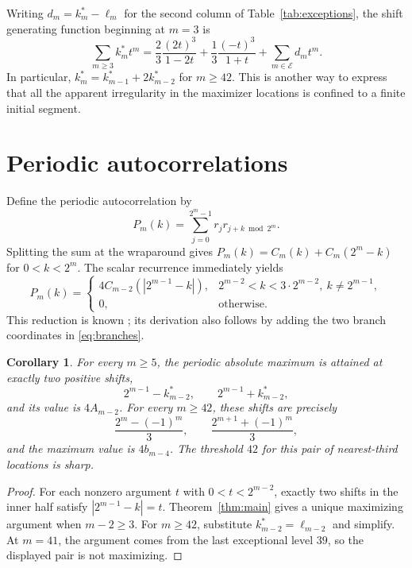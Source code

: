 \documentclass[11pt,a4paper]{article}
\newtheorem{corollary}[theorem]{Corollary}
\theoremstyle{definition}\newtheorem{definition}[theorem]{Definition}
\theoremstyle{remark}\newtheorem{remark}[theorem]{Remark}
\begin{document}
Writing $d_m=k_m^*-\ell_m$ for the second column of
Table~\ref{tab:exceptions}, the shift generating function beginning at $m=3$
is
\begin{equation}
 \sum_{m\ge3}k_m^*t^m
 =\frac23\frac{(2t)^3}{1-2t}
  +\frac13\frac{(-t)^3}{1+t}
  +\sum_{m\in\mathcal E}d_mt^m.
 \label{eq:shiftgf}
\end{equation}
In particular, $k_m^*=k_{m-1}^*+2k_{m-2}^*$ for $m\ge42$.
This is another way to express that all the apparent irregularity in the
maximizer locations is confined to a finite initial segment.

\section{Periodic autocorrelations}
\label{sec:periodic}

Define the periodic autocorrelation by
\[
 P_m(k)=\sum_{j=0}^{2^m-1}r_jr_{j+k\bmod2^m}.
\]
Splitting the sum at the wraparound gives
$P_m(k)=C_m(k)+C_m(2^m-k)$ for $0<k<2^m$.
The scalar recurrence immediately yields
\begin{equation}
 P_m(k)=
 \begin{cases}
 4C_{m-2}(|2^{m-1}-k|),&2^{m-2}<k<3\cdot2^{m-2},\ k\ne2^{m-1},\\
 0,&\text{otherwise}.
 \end{cases}
 \label{eq:periodic}
\end{equation}
This reduction is known \citep[Theorem~12]{Tarnu2023}; its derivation also
follows by adding the two branch coordinates in \eqref{eq:branches}.

\begin{corollary}
\label{cor:periodic}
For every $m\ge5$, the periodic absolute maximum is attained at exactly two
positive shifts,
\[
 2^{m-1}-k_{m-2}^*,\qquad 2^{m-1}+k_{m-2}^*,
\]
and its value is $4A_{m-2}$. For every $m\ge42$, these shifts are precisely
\begin{equation}
 \frac{2^m-(-1)^m}{3},\qquad
 \frac{2^{m+1}+(-1)^m}{3},
 \label{eq:periodicmax}
\end{equation}
and the maximum value is $4b_{m-4}$. The threshold $42$ for this pair of
nearest-third locations is sharp.
\end{corollary}
\begin{proof}
For each nonzero argument $t$ with $0<t<2^{m-2}$, exactly two shifts in the
inner half satisfy $|2^{m-1}-k|=t$. Theorem~\ref{thm:main} gives a unique
maximizing argument when $m-2\ge3$. For $m\ge42$, substitute
$k_{m-2}^*=\ell_{m-2}$ and simplify. At $m=41$, the argument comes from the
last exceptional level $39$, so the displayed pair is not maximizing.
\end{proof}
\end{document}
